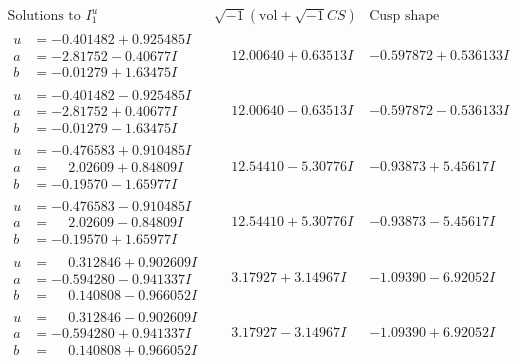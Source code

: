 \documentclass[1p]{elsarticle_modified}
\theoremstyle{definition}
\newcommand{\I}{\sqrt{-1}}
\begin{document}
$$\begin{array}{c|c|c}  
\text{Solutions to }I^u_{1}& \I (\text{vol} + \sqrt{-1}CS) & \text{Cusp shape}\\
 \hline 
\begin{aligned}
u &= -0.401482 + 0.925485 I \\
a &= -2.81752 - 0.40677 I \\
b &= -0.01279 + 1.63475 I\end{aligned}
 & \phantom{-}12.00640 + 0.63513 I & -0.597872 + 0.536133 I \\ \hline\begin{aligned}
u &= -0.401482 - 0.925485 I \\
a &= -2.81752 + 0.40677 I \\
b &= -0.01279 - 1.63475 I\end{aligned}
 & \phantom{-}12.00640 - 0.63513 I & -0.597872 - 0.536133 I \\ \hline\begin{aligned}
u &= -0.476583 + 0.910485 I \\
a &= \phantom{-}2.02609 + 0.84809 I \\
b &= -0.19570 - 1.65977 I\end{aligned}
 & \phantom{-}12.54410 - 5.30776 I & -0.93873 + 5.45617 I \\ \hline\begin{aligned}
u &= -0.476583 - 0.910485 I \\
a &= \phantom{-}2.02609 - 0.84809 I \\
b &= -0.19570 + 1.65977 I\end{aligned}
 & \phantom{-}12.54410 + 5.30776 I & -0.93873 - 5.45617 I \\ \hline\begin{aligned}
u &= \phantom{-}0.312846 + 0.902609 I \\
a &= -0.594280 - 0.941337 I \\
b &= \phantom{-}0.140808 - 0.966052 I\end{aligned}
 & \phantom{-}3.17927 + 3.14967 I & -1.09390 - 6.92052 I \\ \hline\begin{aligned}
u &= \phantom{-}0.312846 - 0.902609 I \\
a &= -0.594280 + 0.941337 I \\
b &= \phantom{-}0.140808 + 0.966052 I\end{aligned}
 & \phantom{-}3.17927 - 3.14967 I & -1.09390 + 6.92052 I \\ \hline\begin{aligned}

\end{aligned}
\end{array}$$
\end{document}
